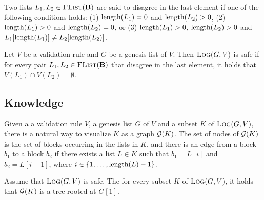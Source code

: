 %
%

Two lists $L_1, L_2 \in \text{\sc FList}(\text{\bf B})$ are said to disagree in the last element if one of the following conditions holds: (1) $\text{\rm length}(L_1) = 0$ and $\text{\rm length}(L_2) > 0$, (2) $\text{\rm length}(L_1) > 0$ and $\text{\rm length}(L_2) = 0$, or (3) $\text{\rm length}(L_1) > 0$, $\text{\rm length}(L_2) > 0$ and $L_1[\text{\rm length}(L_1)] \neq L_2[\text{\rm length}(L_2)]$.
\begin{mydef}
Let $V$ be a validation rule and $G$ be a genesis list of $V$. Then $\text{\sc Log}(G,V)$ is safe if for every pair $L_1, L_2 \in \text{\sc FList}(\text{\bf B})$ that disagree in the last element, it holds that $V(L_1) \cap V(L_2) = \emptyset$.
\end{mydef}


\subsection{Knowledge}

Given a  a validation rule $V$, a genesis list $G$ of $V$ and a subset $K$ of $\text{\sc Log}(G,V)$, there is a natural way to  visualize  $K$ as a graph $\mathcal{G}(K)$. The set of nodes of $\mathcal{G}(K)$ is the set of blocks occurring in the lists in $K$, and there is an edge from a block $b_1$ to a block $b_2$ if there exists a list $L \in K$ such that $b_1 = L[i]$ and $b_2 = L[i+1]$, where $i \in \{1, \ldots, \text{\rm length}(L) -1\}$.
\begin{mylem}
Assume that $\text{\sc Log}(G,V)$ is safe. The for every subset $K$ of $\text{\sc Log}(G,V)$, it holds that $\mathcal{G}(K)$ is a tree rooted at $G[1]$.
\end{mylem}

\\ 

